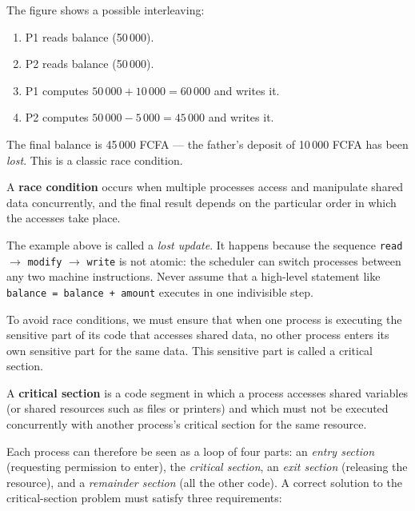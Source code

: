 \documentclass[11pt]{article}
\newcommand{\cle}[1]{{\popxbold\color{popdark}#1}}
\newcounter{popsec}
\newcounter{popsub}
\newcommand{\courssub}[1]{%
  \stepcounter{popsub}%
  \par\vspace{9pt}\noindent{\popxbold\fontsize{11.5}{13}\selectfont\color{popink}{\color{poporange}\thepopsec.\thepopsub}\hspace{6pt}#1}\par\nopagebreak\vspace{4pt}
}
\begin{document}
The figure shows a possible interleaving:
\begin{enumerate}
  \item P1 reads balance (50\,000).
  \item P2 reads balance (50\,000).
  \item P1 computes $50\,000 + 10\,000 = 60\,000$ and writes it.
  \item P2 computes $50\,000 - 5\,000 = 45\,000$ and writes it.
\end{enumerate}
The final balance is 45\,000 FCFA — the father's deposit of 10\,000 FCFA has been \emph{lost}. This is a classic \cle{race condition}.

\begin{definition}
A \textbf{race condition} occurs when multiple processes access and manipulate shared data concurrently, and the final result depends on the particular order in which the accesses take place.
\end{definition}

\begin{attention}
The example above is called a \emph{lost update}. It happens because the sequence \texttt{read} $\to$ \texttt{modify} $\to$ \texttt{write} is not atomic: the scheduler can switch processes between any two machine instructions. Never assume that a high-level statement like \texttt{balance = balance + amount} executes in one indivisible step.
\end{attention}

\courssub{The Critical Section Problem}

To avoid race conditions, we must ensure that when one process is executing the sensitive part of its code that accesses shared data, no other process enters its own sensitive part for the same data. This sensitive part is called a \cle{critical section}.

\begin{definition}
A \textbf{critical section} is a code segment in which a process accesses shared variables (or shared resources such as files or printers) and which must not be executed concurrently with another process's critical section for the same resource.
\end{definition}

Each process can therefore be seen as a loop of four parts: an \emph{entry section} (requesting permission to enter), the \emph{critical section}, an \emph{exit section} (releasing the resource), and a \emph{remainder section} (all the other code). A correct solution to the critical-section problem must satisfy three requirements:
\end{document}
